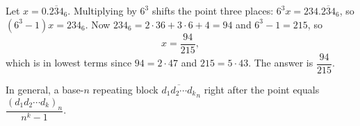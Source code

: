 Let $x=0.\overline{234}_6$. Multiplying by $6^3$ shifts the point three places: $6^3x=234.\overline{234}_6$, so $(6^3-1)x=234_6$. Now $234_6=2\cdot36+3\cdot6+4=94$ and $6^3-1=215$, so
\[x=\dfrac{94}{215},\]
which is in lowest terms since $94=2\cdot47$ and $215=5\cdot43$. The answer is $\boxed{\dfrac{94}{215}}$.

In general, a base-$n$ repeating block $\overline{d_1d_2\cdots d_k}_n$ right after the point equals $\dfrac{(d_1d_2\cdots d_k)_n}{n^k-1}$.
